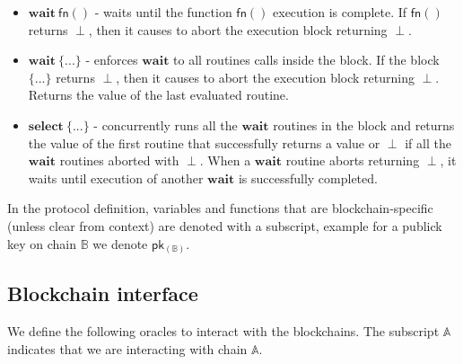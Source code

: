 \documentclass{article}      	%
\begin{document}
\begin{itemize}[nosep, noitemsep] 
    \item $\mathbf{wait} \: \mathsf{fn}()$ - waits until the function $\mathsf{fn}()$ execution is complete. If $\mathsf{fn}()$ returns $\perp$, then it causes to abort the execution block returning $\perp$. \\
    \item $\mathbf{wait} \: \{...\}$ - enforces $\mathbf{wait}$ to all routines calls inside the block. If the block $\{...\}$ returns $\perp$, then it causes to abort the execution block returning $\perp$. Returns the value of the last evaluated routine. \\
    \item $\mathbf{select} \: \{...\}$ - concurrently runs all the $\mathbf{wait}$ routines in the block and returns the value of the first routine that successfully returns a value or $\perp$ if all the $\mathbf{wait}$ routines aborted with $\perp$. When a $\mathbf{wait}$ routine aborts returning $\perp$, it waits until execution of another $\mathbf{wait}$ is successfully completed. \\
\end{itemize}

In the protocol definition, variables and functions that are blockchain-specific (unless clear from context) are denoted with a subscript, example for a publick key on chain $\mathbb{B}$ we denote $\mathsf{pk_{(\mathbb{B})}}$. \\


\subsection{Blockchain interface}

We define the following oracles to interact with the blockchains. The subscript $\mathbb{A}$ indicates that we are interacting with chain $\mathbb{A}$.
\end{document}
